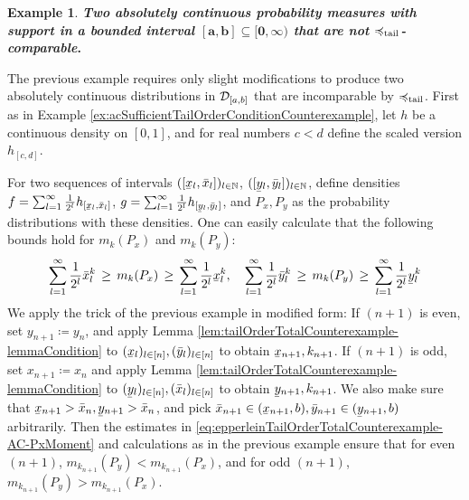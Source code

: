 \documentclass[a4paper,DIV=11,abstracton,twoside=semi]{scrreprt}
\theoremstyle{definition}
\newtheorem{ex}[thm]{Example} %
\begin{document}
    \begin{ex}\textbf{\textsl{Two absolutely continuous probability measures with support in a bounded interval $\mathbf{\boldsymbol{[a, b] \subseteq [0, \infty)}}$ that are not $\preccurlyeq_{\text{tail}}$-comparable}.}
        
        The previous example requires only slight modifications to produce two absolutely continuous distributions in $\mathcal{D}_{[a, b]}$ that are incomparable by $\preccurlyeq_{\text{tail}}$.
        First as in Example \ref{ex:acSufficientTailOrderConditionCounterexample}, let $h$ be a continuous density on $[0, 1]$, and for real numbers $c < d$ define the scaled version $h_{[c, d]}$.
        
        For two sequences of intervals $([\ubar{x}_l, \bar{x}_l])_{l \in \N}$, $([\ubar{y}_l, \bar{y}_l])_{l \in \N}$, define densities
        $f = \sum_{l=1}^{\infty}\frac{1}{2^l} h_{[\ubar{x}_l, \bar{x}_l]}$, $g = \sum_{l=1}^{\infty}\frac{1}{2^l} h_{[\ubar{y}_l, \bar{y}_l]}$, and $P_x, P_y$ as the probability distributions with these densities.
        One can easily calculate that the following bounds hold for $m_k(P_x)$ and $m_k(P_y)$:
        \begin{gather}
            \sum_{l =1}^\infty \frac{1}{2^l} \bar{x}_l^k \,\geq\, m_k(P_x) \,\geq\, \sum_{l =1}^\infty \frac{1}{2^l} \ubar{x}_l^k,\quad
            \sum_{l =1}^\infty \frac{1}{2^l} \bar{y}_l^k \,\geq\, m_k(P_y) \,\geq\, \sum_{l =1}^\infty \frac{1}{2^l} \ubar{y}_l^k
            \label{eq:epperleinTailOrderTotalCounterexample-AC-PxMoment}
        \end{gather}
        We apply the trick of the previous example in modified form:
        If $(n+1)$ is even, set $y_{n+1} \coloneqq y_n$, and apply Lemma \ref{lem:tailOrderTotalCounterexample-lemmaCondition} to $(\ubar{x}_l)_{l \in [n]}, (\bar{y}_l)_{l \in [n]}$ to obtain $\ubar{x}_{n+1}, k_{n+1}$. If $(n+1)$ is odd, set $x_{n+1} \coloneqq x_n$ and apply Lemma \ref{lem:tailOrderTotalCounterexample-lemmaCondition} to $(\ubar{y}_l)_{l \in [n]}, (\bar{x}_l)_{l \in [n]}$ to obtain $\ubar{y}_{n+1}, k_{n+1}$. We also make sure that $\ubar{x}_{n+1} > \bar{x}_{n}, \ubar{y}_{n+1} > \bar{x}_n$, and pick $\bar{x}_{n+1} \in (\ubar{x}_{n+1}, b), \bar{y}_{n+1} \in (\ubar{y}_{n+1}, b)$ arbitrarily.
        Then the estimates in \eqref{eq:epperleinTailOrderTotalCounterexample-AC-PxMoment} and calculations as in the previous example ensure that for even $(n+1)$,  $m_{k_{n+1}}(P_y) < m_{k_{n+1}}(P_x)$, and for odd $(n+1)$, $m_{k_{n+1}}(P_y) > m_{k_{n+1}}(P_x)$.
        

\end{ex}
\end{document}

